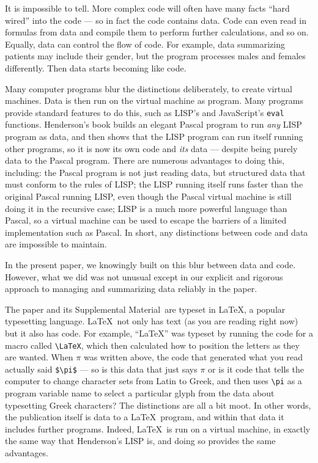 \documentclass{article}
\def\supplement{Supplemental Material}
\begin{document}
It is impossible to tell. More complex code will often have many facts ``hard wired'' into the code --- so in fact the code contains data. Code can even read in formulas from data and compile them to perform further calculations, and so on. Equally, data can control the flow of code. For example, data summarizing patients may include their gender, but the program processes males and females differently. Then data starts becoming like code. 

{Many computer programs blur the distinctions deliberately, to create virtual machines. Data is then run on the virtual machine as program. Many programs provide standard features to do this, such as LISP's and JavaScript's \texttt{eval} functions. Henderson's book \cite{henderson} builds an elegant Pascal program to run \emph{any\/} LISP program as data, and then shows that the LISP program can run itself running other programs, so it is now its own code and \emph{its\/} data --- despite being purely data to the Pascal program. There are numerous advantages to doing this, including: the Pascal program is not just reading data, but structured data that must conform to the rules of LISP; the LISP running itself runs faster than the original Pascal running LISP, even though the Pascal virtual machine is still doing it in the recursive case; LISP is a much more powerful language than Pascal, so a virtual machine can be used to escape the barriers of a limited implementation such as Pascal. In short, any distinctions between code and data are impossible to maintain.}

In the present paper, we knowingly built on this blur between data and code. However, what we did was not unusual except in our explicit and rigorous approach to managing and summarizing data reliably in the paper.

The paper and its \supplement\ are typeset in \LaTeX, a popular typesetting language. \LaTeX\ not only has text (as you are reading right now) but it also has code. For example, ``\LaTeX'' was typeset by running the code for a macro called \verb|\LaTeX|, which then calculated how to position the letters as they are wanted. When $\pi$ was written above, the code that generated what you read actually said \verb|$\pi$| --- so is this data that just says $\pi$ or is it code that tells the computer to change character sets from Latin to Greek, and then uses \verb|\pi| as a program variable name to select a particular glyph from the data about typesetting Greek characters? The distinctions are all a bit moot. In other words, the publication itself is data to a \LaTeX\ program, and within that data it includes further programs. Indeed, \LaTeX\ is run on a virtual machine, in exactly the same way that Henderson's LISP is, and doing so provides the same advantages.
\end{document}
